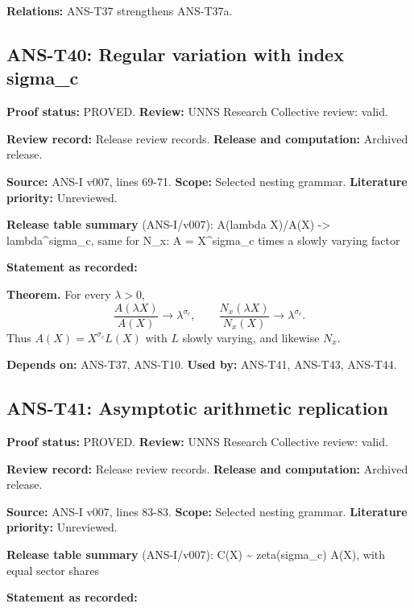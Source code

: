 \documentclass[
  11pt,
]{article}
\begin{document}
\textbf{Relations:} ANS-T37 strengthens ANS-T37a.

\hypertarget{ans-t40-regular-variation-with-index-sigma_c}{%
\subsection{ANS-T40: Regular variation with index
sigma\_c}\label{ans-t40-regular-variation-with-index-sigma_c}}

\textbf{Proof status:} PROVED. \textbf{Review:} UNNS Research Collective
review: valid.

\textbf{Review record:} Release review records. \textbf{Release and
computation:} Archived release.

\textbf{Source:} ANS-I v007, lines 69-71. \textbf{Scope:} Selected
nesting grammar. \textbf{Literature priority:} Unreviewed.

\textbf{Release table summary} (ANS-I/v007): A(lambda X)/A(X)
-\textgreater{} lambda\^{}sigma\_c, same for N\_x: A = X\^{}sigma\_c
times a slowly varying factor

\textbf{Statement as recorded:}

\textbf{Theorem.} For every \(\lambda>0\),
\[\frac{A(\lambda X)}{A(X)}\to\lambda^{\sigma_c},\qquad\frac{N_x(\lambda X)}{N_x(X)}\to\lambda^{\sigma_c}.\]
Thus \(A(X)=X^{\sigma_c}L(X)\) with \(L\) slowly varying, and likewise
\(N_x\).

\textbf{Depends on:} ANS-T37, ANS-T10. \textbf{Used by:} ANS-T41,
ANS-T43, ANS-T44.

\hypertarget{ans-t41-asymptotic-arithmetic-replication}{%
\subsection{ANS-T41: Asymptotic arithmetic
replication}\label{ans-t41-asymptotic-arithmetic-replication}}

\textbf{Proof status:} PROVED. \textbf{Review:} UNNS Research Collective
review: valid.

\textbf{Review record:} Release review records. \textbf{Release and
computation:} Archived release.

\textbf{Source:} ANS-I v007, lines 83-83. \textbf{Scope:} Selected
nesting grammar. \textbf{Literature priority:} Unreviewed.

\textbf{Release table summary} (ANS-I/v007): C(X) \textasciitilde{}
zeta(sigma\_c) A(X), with equal sector shares

\textbf{Statement as recorded:}
\end{document}
